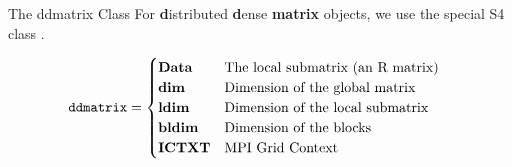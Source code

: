\begin{frame}
  \begin{block}{The ddmatrix Class}\pause
  For \textbf{d}istributed \textbf{d}ense \textbf{matrix} objects, we use the 
special S4 class .

  \begin{align*}
  \hspace{.1cm}\text{\code{ddmatrix}}&=\begin{cases}
  $\textbf{Data}$ & $The local submatrix (an R matrix)$\\
  $\textbf{dim}$ & $Dimension of the global matrix$\\
  $\textbf{ldim}$ & $Dimension of the local submatrix$\\
  $\textbf{bldim}$ & $Dimension of the blocks$\\
  $\textbf{ICTXT}$ & $MPI Grid Context$
  \end{cases}
  \end{align*}

  \end{block}
\end{frame}





